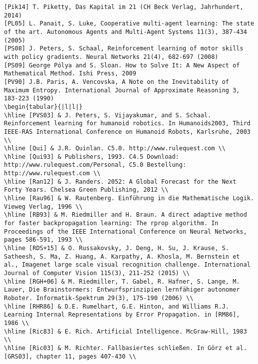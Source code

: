\documentclass[10pt]{article}
\begin{document}
\begin{verbatim}
[Pik14] T. Piketty, Das Kapital im 21 (CH Beck Verlag, Jahrhundert, 2014)
[PL05] L. Panait, S. Luke, Cooperative multi-agent learning: The state of the art. Autonomous Agents and Multi-Agent Systems 11(3), 387-434 (2005)
[PS08] J. Peters, S. Schaal, Reinforcement learning of motor skills with policy gradients. Neural Networks 21(4), 682-697 (2008)
[PS09] George Pólya and S. Sloan. How to Solve It: A New Aspect of Mathematical Method. Ishi Press, 2009
[PV90] J.B. Paris, A. Vencovska, A Note on the Inevitability of Maximum Entropy. International Journal of Approximate Reasoning 3, 183-223 (1990)
\begin{tabular}{|l|l|}
\hline [PVS03] & J. Peters, S. Vijayakumar, and S. Schaal. Reinforcement learning for humanoid robotics. In Humanoids2003, Third IEEE-RAS International Conference on Humanoid Robots, Karlsruhe, 2003 \\
\hline [Qui] & J.R. Quinlan. C5.0. http://www.rulequest.com \\
\hline [Qui93] & Publishers, 1993. C4.5 Download: http://www.rulequest.com/Personal, C5.0 Bestellung: http://www.rulequest.com \\
\hline [Ran12] & J. Randers. 2052: A Global Forecast for the Next Forty Years. Chelsea Green Publishing, 2012 \\
\hline [Rau96] & W. Rautenberg. Einführung in die Mathematische Logik. Vieweg Verlag, 1996 \\
\hline [RB93] & M. Riedmiller and H. Braun. A direct adaptive method for faster backpropagation learning: The rprop algorithm. In Proceedings of the IEEE International Conference on Neural Networks, pages 586-591, 1993 \\
\hline [RDS+15] & O. Russakovsky, J. Deng, H. Su, J. Krause, S. Satheesh, S. Ma, Z. Huang, A. Karpathy, A. Khosla, M. Bernstein et al., Imagenet large scale visual recognition challenge. International Journal of Computer Vision 115(3), 211-252 (2015) \\
\hline [RGH+06] & M. Riedmiller, T. Gabel, R. Hafner, S. Lange, M. Lauer, Die Brainstormers: Entwurfsprinzipien lernfähiger autonomer Roboter. Informatik-Spektrum 29(3), 175-190 (2006) \\
\hline [RHR86] & D.E. Rumelhart, G.E. Hinton, and Williams R.J. Learning Internal Representations by Error Propagation. in [RM86], 1986 \\
\hline [Ric83] & E. Rich. Artificial Intelligence. McGraw-Hill, 1983 \\
\hline [Ric03] & M. Richter. Fallbasiertes schließen. In Görz et al. [GRS03], chapter 11, pages 407-430 \\

\end{verbatim}
\end{document}
